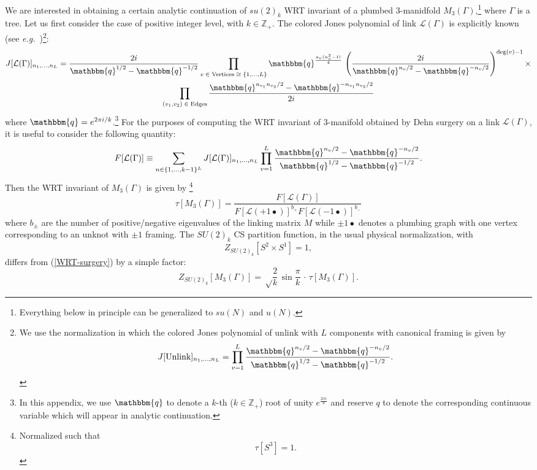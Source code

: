 \documentclass[hyper,letterpaper]{JHEP3}
\newcommand{\Z}{{\mathbb Z}}
\def\CL{{\mathcal L}}
\def\eg{{\textit{e.g.}}}
\def\q{{\mathbbm{q}}}
\begin{document}
{We are interested in obtaining a certain analytic continuation of $su(2)_k$ WRT invariant \cite{reshetikhin1991invariants,witten1989quantum} of a plumbed 3-manidfold $M_3(\Gamma)$,\footnote{Everything below in principle can be generalized to $su(N)$ and $u(N)$.} where $\Gamma$ is a tree. Let us first consider the case of positive integer level, with $k\in \Z_+$. The colored Jones polynomial of link $\CL(\Gamma)$ is explicitly known (see \eg~\cite{witten1989quantum})\footnote{We use the normalization in which the colored Jones polynomial of unlink with $L$ components with canonical framing is given by
\begin{equation}
 J[\text{Unlink}]_{n_1,\ldots,n_L}=\prod_{v=1}^L \frac{\q^{n_v/2}-\q^{-n_v/2}}{\q^{1/2}-\q^{-1/2}}.
\end{equation}
}:
\begin{multline}
 J[\CL(\Gamma)]_{n_1,\ldots,n_L}=\frac{2i}{\q^{1/2}-\q^{-1/2}}\prod_{v\;\in\; \text{Vertices}\;\cong\;\{1,\ldots,L\}}
\q^{\frac{a_v(n_v^2-1)}{4}}
\,\left(\frac{2i}{\q^{n_v/2}-\q^{-n_v/2}}\right)^{\text{deg}(v)-1}
\times \\
\prod_{(v_1,v_2)\;\in\;\text{Edges}}
\frac{\q^{n_{v_1}n_{v_2}/2}-\q^{-n_{v_1}n_{v_2}/2}}{2i}
\end{multline}
where $\q=e^{2\pi i/k}$.\footnote{In this appendix, we use $\q$ to denote a $k$-th ($k\in\Z_+$) root of unity $e^{\frac{2\pi i}k}$ and reserve $q$ to denote the corresponding continuous variable which will appear in analytic continuation.} For the purposes of computing the WRT invariant of 3-manifold obtained by Dehn surgery on a link $\CL(\Gamma)$, it is useful to consider the following quantity:
\begin{equation}
 F[\CL(\Gamma)]\equiv \sum_{{n}\in \{1,\ldots,k-1\}^{L}} J[\CL(\Gamma)]_{n_1,\ldots,n_L}
\prod_{v=1}^L \frac{\q^{n_v/2}-\q^{-n_v/2}}{\q^{1/2}-\q^{-1/2}}.
\end{equation}
Then the WRT invariant of $M_3(\Gamma)$ is given by \cite{reshetikhin1991invariants}\footnote{Normalized such that
\begin{equation}
 \tau[S^3]=1.
\end{equation}
}
\begin{equation}
 \tau[M_3(\Gamma)]=\frac{F[\CL(\Gamma)]}{F[\CL(+1\bullet)]^{b_+}F[\CL(-1\bullet)]^{b_-}}
\label{WRT-surgery}
\end{equation}
where $b_\pm$ are the number of positive/negative eigenvalues of the linking matrix $M$ while $\pm1 \bullet$ denotes a plumbing graph with one vertex corresponding to an unknot with $\pm 1$ framing. The $SU(2)_k$ CS partition function, in the usual physical normalization, with
\begin{equation}
 Z_{SU(2)_k}[S^2\times S^1]=1,
\end{equation}
differs from (\ref{WRT-surgery}) by a simple factor:
\begin{equation}
 Z_{SU(2)_k}[M_3(\Gamma)]=\sqrt\frac{2}{k}\,\sin\frac{\pi}{k}\,\cdot\,\tau[M_3(\Gamma)].
\end{equation}

}
\end{document}
